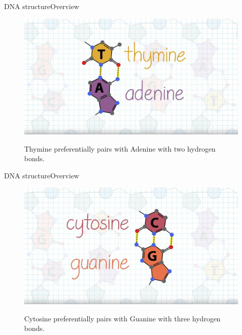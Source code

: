 \documentclass[10pt]{beamer}
\begin{document}
{%
\begin{frame}{DNA structure}{Overview}
	\begin{figure}[]
		\centering
		\includegraphics[width=\textwidth,height=0.7\textheight,keepaspectratio]{img/introduction/dna21.jpg}
		\label{img:mot2}
		\caption{Thymine preferentially pairs with Adenine with two hydrogen bonds.}
	\end{figure}
\end{frame}

\begin{frame}{DNA structure}{Overview}
	\begin{figure}[]
		\centering
		\includegraphics[width=\textwidth,height=0.7\textheight,keepaspectratio]{img/introduction/dna22.jpg}
		\label{img:mot2}
		\caption{Cytosine preferentially pairs with Guanine with three hydrogen bonds.}
	\end{figure}
\end{frame}

}
\end{document}
